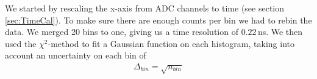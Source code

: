 \documentclass[a4paper,parskip,11pt, DIV12]{scrreprt}
\begin{document}
%
%
We started by rescaling the x-axis from ADC channels to time (see section \ref{sec:TimeCal}). To make sure there are enough counts per bin we had to rebin the data. We merged 20 bins to one, giving us a time resolution of $0.22\,$ns. We then used the $\chi^2$-method to fit a Gaussian function on each histogram, taking into account an uncertainty on each bin of 
%
\begin{align}
\Delta_{bin} = \sqrt{n_{bin}}
\end{align}
\end{document}
